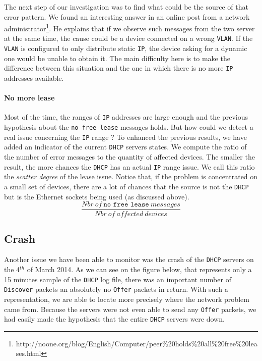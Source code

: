 The next step of our investigation was to find what could be the source of that error pattern. We found an interesting answer in an online post from a network administrator\footnote{http://noone.org/blog/English/Computer/peer\%20holds\%20all\%20free\%20leases.html}. He explains that if we observe such messages from the two server at the same time, the cause could be a device connected on a wrong \texttt{VLAN}. If the \texttt{VLAN} is configured to only distribute static \texttt{IP}, the device asking for a dynamic one would be unable to obtain it. The main difficulty here is to make the difference between this situation and the one in which there is no more \texttt{IP} addresses available.


\paragraph*{No more lease} Most of the time, the ranges of \texttt{IP} addresses are large enough and the previous hypothesis about the \texttt{no free lease} messages holds. But how could we detect a real issue concerning the \texttt{IP} range ? To enhanced the previous results, we have added an indicator of the current \texttt{DHCP} servers states. We compute the ratio of the number of error messages to the quantity of affected devices. The smaller the result, the more chances the \texttt{DHCP} has an actual \texttt{IP} range issue. We call this ratio the \emph{scatter degree} of the lease issue. Notice that, if the problem is concentrated on a small set of devices, there are a lot of chances that the source is not the \texttt{DHCP} but is the Ethernet sockets being used (as discussed above).
\[ \frac{Nbr\ of\ \texttt{no free lease}\ messages}{Nbr\ of\ affected\ devices} \] 


\subsection{Crash}
Another issue we have been able to monitor was the crash of the \texttt{DHCP} servers on the 4$^{th}$ of March 2014. As we can see on the figure below, that represents only a 15 minutes sample of the \texttt{DHCP} log file, there was an important number of \texttt{Discover} packets an absolutely no \texttt{Offer} packets in return. With such a representation, we are able to locate more precisely where the network problem came from. Because the servers were not even able to send any \texttt{Offer} packets, we had easily made the hypothesis that the entire \texttt{DHCP} servers were down.

